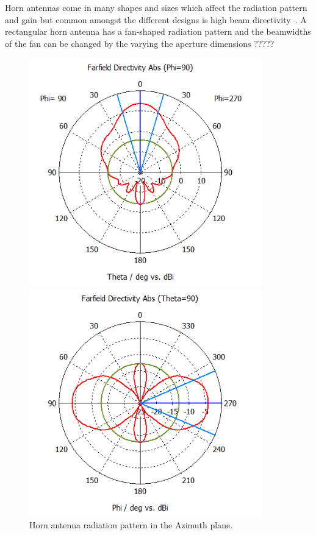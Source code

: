 Horn antennas come in many shapes and sizes which affect the radiation pattern and gain but common amongst the different designs is high beam directivity~\cite[p. 14.1]{ant_eng_hk}. A rectangular horn antenna has a fan-shaped radiation pattern and the beamwidths of the fan can be changed by the varying the aperture dimensions ?????
\begin{figure}[H]
    \begin{minipage}{0.45\textwidth}
        \centering
        \includegraphics[width=0.9\textwidth]{figures/farfield (f=2.4) horn.png} %
        \caption{Horn antenna radiation pattern in the Azimuth plane.} 
        \label{fig:horn_1}
    \end{minipage}\hfill
    \begin{minipage}{0.45\textwidth}
        \centering
        \includegraphics[width=0.9\textwidth]{figures/farfield (f=2.4) horn_1.png} %

\end{minipage}
\end{figure}
